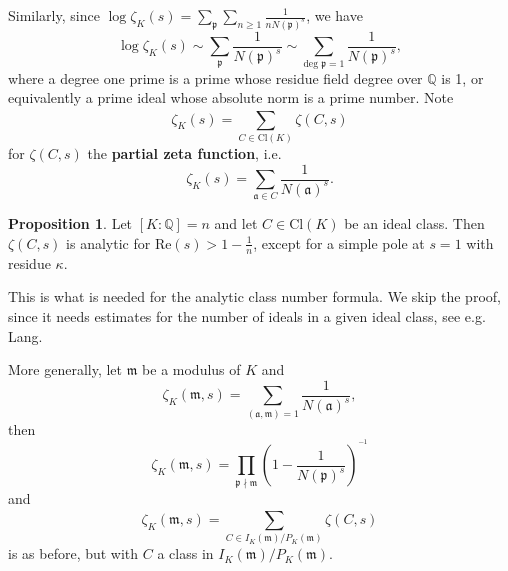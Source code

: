 \documentclass{article}
\theoremstyle{definition}
\newtheorem{prop}[theorem]{Proposition}
\begin{document}
Similarly, since $\log \zeta_K(s) = \sum_{\mathfrak{p}}^{} \sum_{n\ge 1}^{} \frac{1}{nN(\mathfrak{p})^s}$, we have $$\log \zeta_K(s) \sim \sum_{\mathfrak{p}} \frac{1}{N(\mathfrak{p})^s} \sim \sum_{\text{deg }\mathfrak{p}=1}^{} \frac{1}{N(\mathfrak{p})^s},$$
where a degree one prime is a prime whose residue field degree over $\mathbb{Q}$ is 1, or equivalently a prime ideal whose absolute norm is a prime number. Note
\[
\zeta_K(s) = \sum_{C \in \text{Cl}(K)}^{} \zeta(C,s)
\]
for $\zeta(C,s)$ the \textbf{partial zeta function}, i.e.
\[
\zeta_K(s) = \sum_{\mathfrak{a} \in C}^{} \frac{1}{N(\mathfrak{a})^s}.
\]
\begin{prop}\label{prop2.40}
    Let $[K:\mathbb{Q}]=n$ and let $C \in \text{Cl}(K)$ be an ideal class. Then $\zeta(C,s)$ is analytic for $\text{Re}(s)>1-\frac{1}{n}$, except for a simple pole at $s=1$ with residue $\kappa$.
\end{prop}
This is what is needed for the analytic class number formula. We skip the proof, since it needs estimates for the number of ideals in a given ideal class, see e.g. Lang.
\vspace{1mm}
 
More generally, let $\mathfrak{m}$ be a modulus of $K$ and 
\[
\zeta_K(\mathfrak{m},s) = \sum_{(\mathfrak{a},\mathfrak{m})=1}^{} \frac{1}{N(\mathfrak{a})^s}, 
\]
then $$\zeta_K(\mathfrak{m},s) = \prod_{\mathfrak{p}\nmid \mathfrak{m}}^{} \left(1-\frac{1}{N(\mathfrak{p})^s}\right)^{^{-1}}$$
and \[
\zeta_K(\mathfrak{m},s) = \sum_{C \in I_K(\mathfrak{m})/P_K(\mathfrak{m})}^{}\zeta(C,s) 
\]
is as before, but with $C$ a class in $I_K(\mathfrak{m})/P_K(\mathfrak{m})$.
\end{document}
